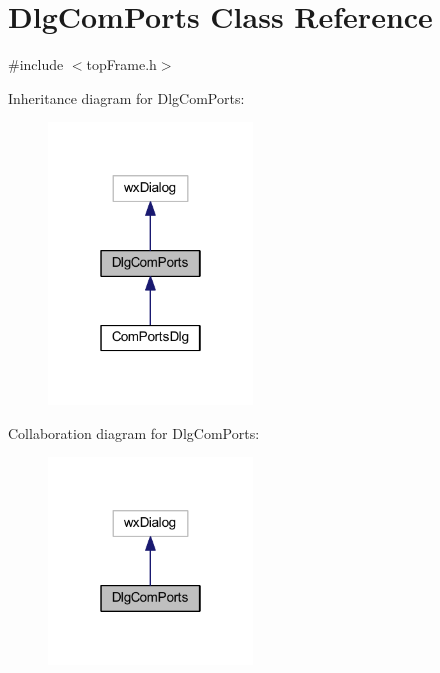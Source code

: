\hypertarget{class_dlg_com_ports}{\section{Dlg\-Com\-Ports Class Reference}
\label{class_dlg_com_ports}
}


{\ttfamily \#include $<$top\-Frame.\-h$>$}



Inheritance diagram for Dlg\-Com\-Ports\-:\nopagebreak
\begin{figure}[H]
\begin{center}
\leavevmode
\includegraphics[width=154pt]{class_dlg_com_ports__inherit__graph}
\end{center}
\end{figure}


Collaboration diagram for Dlg\-Com\-Ports\-:\nopagebreak
\begin{figure}[H]
\begin{center}
\leavevmode
\includegraphics[width=154pt]{class_dlg_com_ports__coll__graph}
\end{center}
\end{figure}
